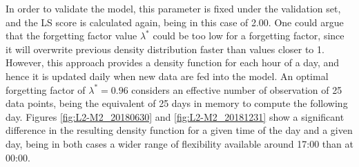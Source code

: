 


\begin{table}[htbp]
\centering
\caption{Results of the cross validation procedure for hyperparameter definition for the Hourly Model in the second level of the hierarchy, using LS as a performance score.}
\label{tab:train-test-score-L2M2}
\vspace*{3mm}
\end{table}

In order to validate the model, this parameter is fixed under the validation set, and the LS score is calculated again, being in this case of 2.00. One could argue that the forgetting factor value $\lambda^{*}$ could be too low for a forgetting factor, since it will overwrite previous density distribution faster than values closer to 1. However, this approach provides a density function for each hour of a day, and hence it is updated daily when new data are fed into the model. An optimal forgetting factor of $\lambda^* = 0.96$ considers an effective number of observation of 25 data points, being the equivalent of 25 days in memory to compute the following day. Figures \ref{fig:L2-M2_20180630} and \ref{fig:L2-M2_20181231} show a significant difference in the resulting density function for a given time of the day and a given day, being in both cases a wider range of flexibility available around 17:00 than at 00:00. 


